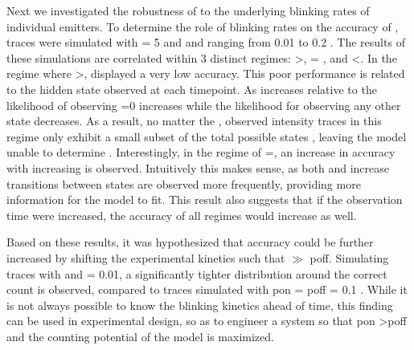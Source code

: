 Next we investigated the robustness of \ours to the underlying blinking rates of individual emitters. 
To determine the role of blinking rates on the accuracy of \ours, traces were simulated with \truen = 5 and \pon and \poff ranging from 0.01 to 0.2 . 
The results of these simulations are correlated within 3 distinct regimes: \poff \textgreater \pon, \poff = \pon, and \poff \textless \pon. 
In the regime where \poff \textgreater \pon, \ours displayed a very low accuracy. This poor performance is related to the hidden state  observed at each timepoint. 
%
As \poff increases relative to \pon the likelihood of observing =0 increases while the likelihood for observing any other state decreases. As a result, no matter the \truen, observed intensity traces in this regime only exhibit a small subset of the total possible states \y{}, leaving the model unable to determine \truen. 
Interestingly, in the regime of \poff=\pon, an increase in \ours accuracy with increasing \pon is observed. Intuitively this makes sense, as both \pon and \poff increase transitions between states are observed more frequently, providing more information for the model to fit. This result also suggests that if the observation time were increased, the accuracy of all regimes would increase as well. 

Based on these results, it was hypothesized that accuracy could be further
increased by shifting the experimental kinetics such that \pon $\gg$ poff. Simulating
traces with  and \poff= 0.01, a significantly tighter distribution
around the correct count is observed, compared to traces simulated with pon =
poff = 0.1 . While it is not always possible to know the blinking
kinetics ahead of time, this finding can be used in experimental design, so as
to engineer a system so that pon \textgreater   poff and the counting potential of the model
is maximized.
